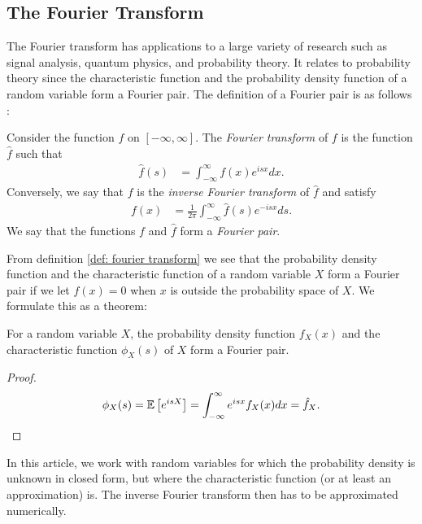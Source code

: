 \subsection{The Fourier Transform}
\label{Sec: fourier transform}
The Fourier transform has applications to a large variety of research such as signal analysis, quantum physics, and probability theory.
It relates to probability theory since the characteristic function and the probability density function of a random variable form a Fourier pair.
The definition of a Fourier pair is as follows \citep{kleppe2006numerical}:
\begin{definition}\label{def: fourier transform}
	Consider the function $f$ on $[-\infty,\infty]$. %
	The \textit{Fourier transform} of $f$ is the function $\hat{f}$ such that
	\begin{align}
	\hat{f}(s) &= \int_{-\infty}^\infty f(x)e^{isx}dx.
	\end{align}
	Conversely, we say that $f$ is the \textit{inverse Fourier transform } of $\hat{f}$ and satisfy
	\begin{align}
	f(x) &= \frac{1}{2\pi}\int_{-\infty}^\infty \hat{f}(s)e^{-isx} ds.
	\end{align}
	We say that the functions $f$ and $\hat{f}$ form a \textit{Fourier pair}.
\end{definition}
From definition \ref{def: fourier transform} we see that the probability density function and the characteristic function of a random variable $X$ form a Fourier pair if we let $f(x)=0$ when $x$ is outside the probability space of $X$.
We formulate this as a theorem:
\begin{theorem}
	For a random variable $X$, the probability density function $f_X(x)$ 
	and the characteristic function $\phi_X(s)$ of $X$ form a Fourier pair.
\end{theorem}
\begin{proof}
	\begin{align}
	\phi_X(s)=\mathbb{E}\left[e^{isX}\right]=\int_{-\infty}^\infty e^{isx}f_X(x)dx = \hat{f}_X.
	\end{align}
\end{proof}
In this article, we work with random variables for which the probability density is unknown in closed form, but where the characteristic function (or at least an approximation) is.
The inverse Fourier transform then has to be approximated numerically.
